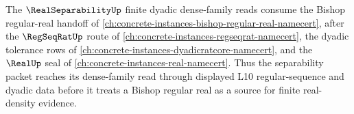 The $\RealSeparabilityUp$ finite dyadic dense-family reads consume the Bishop regular-real handoff of \autoref{ch:concrete-instances-bishop-regular-real-namecert}, after the $\RegSeqRatUp$ route of \autoref{ch:concrete-instances-regseqrat-namecert}, the dyadic tolerance rows of \autoref{ch:concrete-instances-dyadicratcore-namecert}, and the $\RealUp$ seal of \autoref{ch:concrete-instances-real-namecert}. Thus the separability packet reaches its dense-family read through displayed L10 regular-sequence and dyadic data before it treats a Bishop regular real as a source for finite real-density evidence.
